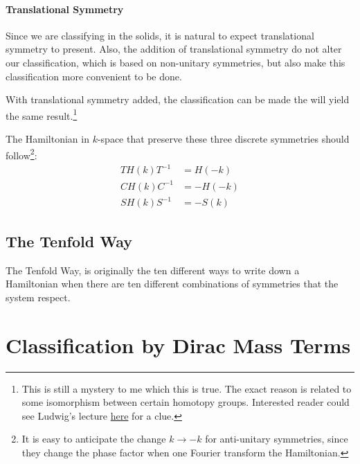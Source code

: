 \documentclass{article}
\begin{document}
\paragraph{Translational Symmetry}

Since we are classifying in the solids, it is natural to expect translational
symmetry to present. Also, the addition of translational symmetry do not alter
our classification, which is based on non-unitary symmetries, but also make this
classification more convenient to be done.

With translational symmetry added, the classification can be made the will yield
the same result.\footnote{This is still a mystery to me which this is true. The
    exact reason is related to some isomorphism between certain homotopy groups.
    Interested reader could see Ludwig's lecture
\href{http://boulderschool.yale.edu/2016/boulder-school-2016-lecture-notes}{here}
for a clue.}

The Hamiltonian in $k$-space that preserve these three discrete symmetries
should follow\footnote{It is easy to anticipate the change $k\to -k$ for
    anti-unitary symmetries, since they change the phase factor when one Fourier
transform the Hamiltonian.}:
\begin{subequations}
\begin{align}
    \label{eq:T-sym-Hk}
    TH(k)T^{-1} &= H(-k) \\
    \label{eq:C-sym-Hk}
    CH(k)C^{-1} &= -H(-k) \\
    \label{eq:S-sym-Hk}
    SH(k)S^{-1} &= -S(k)
\end{align}
\end{subequations}

\subsection{The Tenfold Way}
\label{sec:The Tenfold Way}

The Tenfold Way, is originally the ten different ways to write down a
Hamiltonian when there are ten different combinations of symmetries that the 
system respect.

\section{Classification by Dirac Mass Terms}
\label{sec:The Minimal Hamiltonian Approach}
\end{document}
